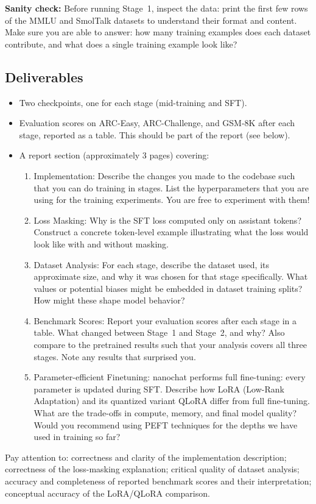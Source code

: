 \textbf{Sanity check:} Before running Stage~1, inspect the data: print the first few rows of the MMLU and SmolTalk datasets to understand their format and content. Make sure you are able to answer: how many training examples does each dataset contribute, and what does a single training example look like?

\subsection{Deliverables}

\begin{itemize}
    \item Two checkpoints, one for each stage (mid-training and SFT).
    \item Evaluation scores on ARC-Easy, ARC-Challenge, and GSM-8K after each stage, reported as a table. This should be part of the report (see below).
    \item A report section (approximately 3 pages) covering:
          \begin{enumerate}
              \item Implementation: Describe the changes you made to the codebase such that you can do training in stages. List the hyperparameters that you are using for the training experiments. You are free to experiment with them!
              \item Loss Masking:  Why is the SFT loss computed only on assistant tokens?  Construct a concrete token-level example illustrating what the loss would look like with and without masking.
              \item Dataset Analysis: For each stage, describe the dataset used, its approximate size, and why it was chosen for that stage specifically.  What values or potential biases might be embedded in dataset training splits?  How might these shape model behavior?
              \item Benchmark Scores: Report your evaluation scores after each stage in a table. What changed between Stage~1 and Stage~2, and why? Also compare to the pretrained results such that your analysis covers all three stages. Note any results that surprised you.
              \item Parameter-efficient Finetuning:  nanochat performs full fine-tuning: every parameter is updated during SFT. Describe how LoRA (Low-Rank Adaptation) and its quantized variant QLoRA differ from full fine-tuning. What are the trade-offs in compute, memory, and final model quality? Would you recommend using PEFT techniques for the depths we have used in training so far?
          \end{enumerate}
\end{itemize}
Pay attention to: correctness and clarity of the implementation description; correctness of the loss-masking explanation; critical quality of dataset analysis; accuracy and completeness of reported benchmark scores and their interpretation; conceptual accuracy of the LoRA/QLoRA comparison.

